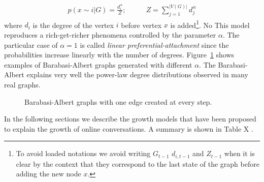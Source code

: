 \documentclass[smallextended]{svjour3}          %
\begin{document}
\begin{align}
	p(x \sim i | G) =\frac{d_{i}^\alpha}{Z}; &\qquad
	Z = \sum_{j=1}^{|V(G)|} d_j^\alpha
\end{align}
where $d_i$ is the degree of the vertex $i$ before vertex $x$ is added\footnote{To avoid loaded notations we avoid writing $G_{t-1}$ $d_{i,t-1}$ and $Z_{t-1}$ when it is clear by the context that they correspond to the last state of the graph before adding the new node $x$.}. No This model reproduces a rich-get-richer phenomena controlled by the parameter $\alpha$. The particular case of $\alpha=1$ is called \textit{linear preferential-attachment} since the probabilities increase linearly with the number of degrees. Figure~\ref{fig:Barabasi-Albert} shows examples of Barabasi-Albert graphs generated with different $\alpha$. The Barabasi-Albert explains very well the power-law degree distributions observed in many real graphs.

\begin{figure}
	\centering
	\caption{Barabasi-Albert graphs with one edge created at every step.}
	\label{fig:Barabasi-Albert}
\end{figure}



In the following sections we describe the growth models that have been proposed to explain the growth of online conversations. A summary is shown in Table X  \citep{Kumar2010, Gomez2010, Wang2012e, Gomez2012}.
\end{document}
